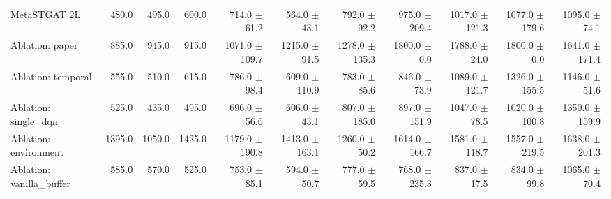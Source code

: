 \begin{table}
\begin{tabular}{@{}lrrrrrrrrrr@{}}
    MetaSTGAT 2L              & 480.0   & 495.0   & 600.0   & 714.0 {\fontsize{4}{4}\selectfont$\pm$61.2}   & 564.0 {\fontsize{4}{4}\selectfont$\pm$43.1}   & 792.0 {\fontsize{4}{4}\selectfont$\pm$92.2}   & 975.0 {\fontsize{4}{4}\selectfont$\pm$209.4}  & 1017.0 {\fontsize{4}{4}\selectfont$\pm$121.3} & 1077.0 {\fontsize{4}{4}\selectfont$\pm$179.6} & 1095.0 {\fontsize{4}{4}\selectfont$\pm$74.1}  \\
    Ablation: paper           & 885.0   & 945.0   & 915.0   & 1071.0 {\fontsize{4}{4}\selectfont$\pm$109.7} & 1215.0 {\fontsize{4}{4}\selectfont$\pm$91.5}  & 1278.0 {\fontsize{4}{4}\selectfont$\pm$135.3} & 1800.0 {\fontsize{4}{4}\selectfont$\pm$0.0}   & 1788.0 {\fontsize{4}{4}\selectfont$\pm$24.0}  & 1800.0 {\fontsize{4}{4}\selectfont$\pm$0.0}   & 1641.0 {\fontsize{4}{4}\selectfont$\pm$171.4} \\
    Ablation: temporal        & 555.0   & 510.0   & 615.0   & 786.0 {\fontsize{4}{4}\selectfont$\pm$98.4}   & 609.0 {\fontsize{4}{4}\selectfont$\pm$110.9}  & 783.0 {\fontsize{4}{4}\selectfont$\pm$85.6}   & 846.0 {\fontsize{4}{4}\selectfont$\pm$73.9}   & 1089.0 {\fontsize{4}{4}\selectfont$\pm$121.7} & 1326.0 {\fontsize{4}{4}\selectfont$\pm$155.5} & 1146.0 {\fontsize{4}{4}\selectfont$\pm$51.6}  \\
    Ablation: single\_dqn     & 525.0   & 435.0   & 495.0   & 696.0 {\fontsize{4}{4}\selectfont$\pm$56.6}   & 606.0 {\fontsize{4}{4}\selectfont$\pm$43.1}   & 807.0 {\fontsize{4}{4}\selectfont$\pm$185.0}  & 897.0 {\fontsize{4}{4}\selectfont$\pm$151.9}  & 1047.0 {\fontsize{4}{4}\selectfont$\pm$78.5}  & 1020.0 {\fontsize{4}{4}\selectfont$\pm$100.8} & 1350.0 {\fontsize{4}{4}\selectfont$\pm$159.9} \\
    Ablation: environment     & 1395.0  & 1050.0  & 1425.0  & 1179.0 {\fontsize{4}{4}\selectfont$\pm$190.8} & 1413.0 {\fontsize{4}{4}\selectfont$\pm$163.1} & 1260.0 {\fontsize{4}{4}\selectfont$\pm$50.2}  & 1614.0 {\fontsize{4}{4}\selectfont$\pm$166.7} & 1581.0 {\fontsize{4}{4}\selectfont$\pm$118.7} & 1557.0 {\fontsize{4}{4}\selectfont$\pm$219.5} & 1638.0 {\fontsize{4}{4}\selectfont$\pm$201.3} \\
    Ablation: vanilla\_buffer & 585.0   & 570.0   & 525.0   & 753.0 {\fontsize{4}{4}\selectfont$\pm$85.1}   & 594.0 {\fontsize{4}{4}\selectfont$\pm$50.7}   & 777.0 {\fontsize{4}{4}\selectfont$\pm$59.5}   & 768.0 {\fontsize{4}{4}\selectfont$\pm$235.3}  & 837.0 {\fontsize{4}{4}\selectfont$\pm$17.5}   & 834.0 {\fontsize{4}{4}\selectfont$\pm$99.8}   & 1065.0 {\fontsize{4}{4}\selectfont$\pm$70.4}  \\

\end{tabular}
\end{table}
